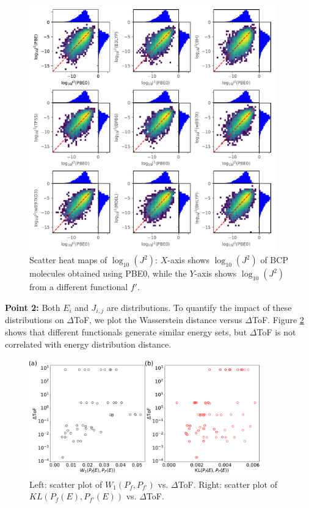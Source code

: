 \documentclass[letterpaper,12pt]{article}
\begin{document}
\begin{figure}[h]
    \centering
    \includegraphics[width=0.95\textwidth]{figs/scatterJ_all.pdf}
    \caption{Scatter heat maps of $\log_{10}(J^2)$: $X$-axis shows $\log_{10}(J^2)$ of BCP molecules obtained using PBE0, while the $Y$-axis shows $\log_{10}(J^2)$ from a different functional $f'$.}
    \label{fig:scatterJ}
\end{figure}

\textbf{Point 2:} Both $E_i$ and $J_{i,j}$ are distributions. To quantify the impact of these distributions on $\Delta$ToF, we plot the Wasserstein distance versus $\Delta$ToF. Figure \ref{fig:distance_ToF} shows that different functionals generate similar energy sets, but $\Delta$ToF is not correlated with energy distribution distance.

\begin{figure}[h]
    \centering
    \includegraphics[width=0.9\textwidth]{figs/DeltaToF_W_KL_E.pdf}
    \caption{Left: scatter plot of $W_1(P_f,P_{f'})$ vs. $\Delta$ToF. Right: scatter plot of $KL(P_f(E),P_{f'}(E))$ vs. $\Delta$ToF.}
    \label{fig:distance_ToF}
\end{figure}
\end{document}
